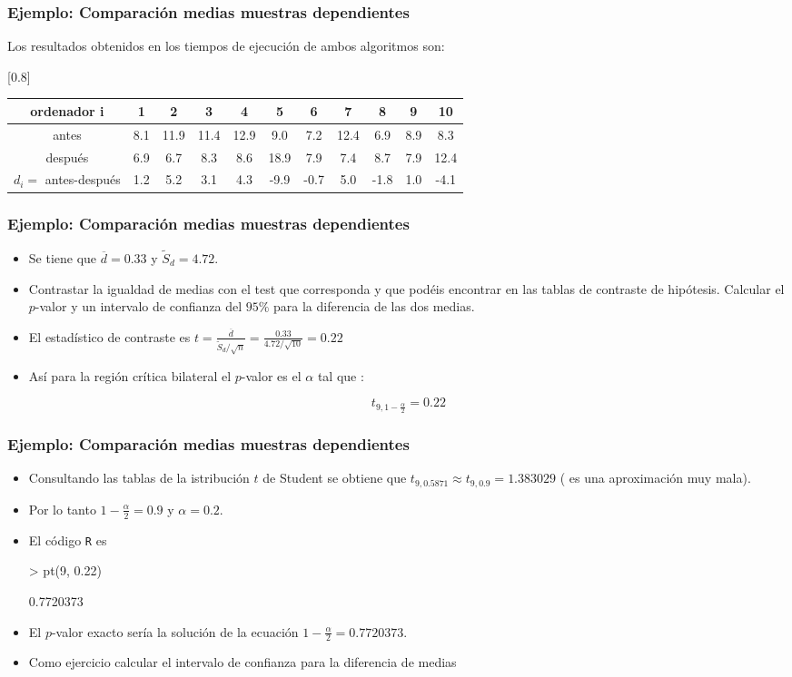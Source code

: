 \begin{frame}
\frametitle{Ejemplo: Comparación medias muestras dependientes}
Los resultados obtenidos en los tiempos de ejecución de ambos algoritmos son:
\begin{table}
\centering
\scalebox{0.80}[0.8]{ 
\begin{tabular}{c|cccccccccc}
ordenador i & 1 & 2 & 3 & 4 & 5 & 6 & 7 & 8 & 9 & 10\\
\hline
antes &  8.1 & 11.9 &  11.4 & 12.9 &  9.0 &  7.2 &  12.4 &  6.9 &  8.9 &  8.3\\
\hline
después & 6.9  &  6.7 &  8.3 &  8.6  &  18.9 &  7.9 &  7.4 &  8.7 &  7.9 &  12.4\\
\hline
$d_i=$ antes-después &  1.2  & 5.2  & 3.1  & 4.3 & -9.9 & -0.7 &  5.0 & -1.8 &  1.0 & -4.1
\end{tabular}}
\end{table}
\end{frame}

\begin{frame}
\frametitle{Ejemplo: Comparación medias muestras dependientes}
\begin{itemize}
\item Se tiene que $\overline{d}=0.33$ y $\tilde{S}_d=4.72$.
\item  Contrastar la igualdad de medias con el test que corresponda y que podéis encontrar en las tablas de contraste de hipótesis. Calcular el $p$-valor y un intervalo de confianza del $95\%$ para la diferencia de las dos medias.
\item
El estadístico de contraste es $t=\frac{\overline{d}}{\tilde{S}_d/\sqrt{n}}=\frac{0.33}{4.72/\sqrt{10}}=0.22$
\item Así para la región crítica bilateral el $p$-valor es el $\alpha$ tal que :

$$t_{9,1-\frac{\alpha}{2}}=0.22$$  
\end{itemize}
\end{frame}

\begin{frame}[fragile]
\frametitle{Ejemplo: Comparación medias muestras dependientes}
\begin{itemize}
\item Consultando las tablas de la istribución $t$ de Student se obtiene que $t_{9,0.5871}\approx  t_{9,0.9}=1.383029$  ( es una aproximación muy mala).
\item Por lo tanto $1-\frac{\alpha}{2}=0.9$ y $\alpha=0.2$.
\item  El código \texttt{R} es
\begin{Schunk}
\begin{Sinput}
> pt(9, 0.22)
\end{Sinput}
\begin{Soutput}
[1] 0.7720373
\end{Soutput}
\end{Schunk}
\item El $p$-valor exacto sería la solución de la ecuación $1-\frac{\alpha}{2}=0.7720373$.
\item Como ejercicio calcular el intervalo de confianza para la diferencia de medias
\end{itemize}
\end{frame}

